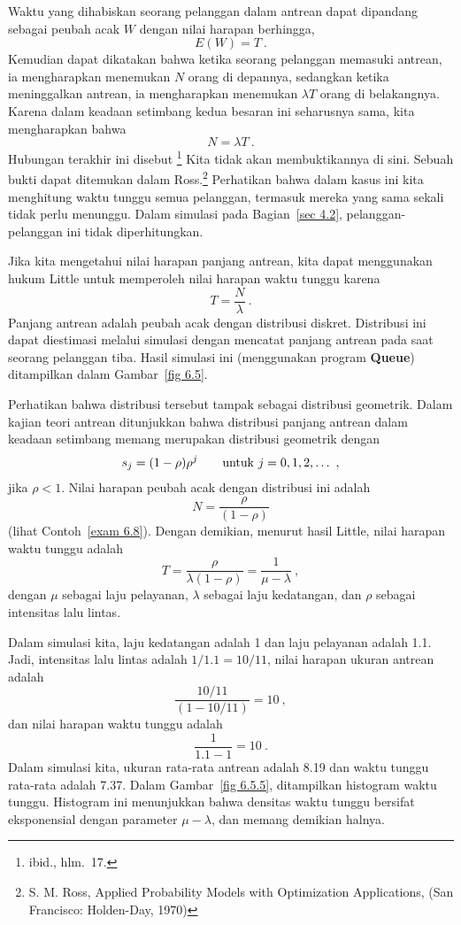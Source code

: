 {\begin{example}
Waktu yang dihabiskan seorang pelanggan dalam antrean dapat dipandang sebagai peubah
acak $W$ dengan nilai harapan berhingga,
$$ E(W) = T\ .
$$ Kemudian dapat dikatakan bahwa ketika seorang pelanggan memasuki antrean, ia
mengharapkan menemukan $N$ orang di depannya, sedangkan ketika meninggalkan antrean,
ia mengharapkan menemukan $\lambda T$ orang di belakangnya. Karena dalam keadaan
setimbang kedua besaran ini seharusnya sama, kita mengharapkan bahwa
$$ N = \lambda T\ .
$$ Hubungan terakhir ini disebut \footnote{ibid., hlm.~17.} Kita tidak akan membuktikannya di sini.
Sebuah bukti dapat ditemukan dalam Ross.\footnote{S. M. Ross,  \emx
{Applied Probability Models with Optimization Applications,} (San Francisco:
Holden-Day, 1970)} Perhatikan bahwa dalam kasus ini kita menghitung waktu tunggu semua
pelanggan, termasuk mereka yang sama sekali tidak perlu menunggu. Dalam simulasi pada
Bagian~\ref{sec 4.2}, pelanggan-pelanggan ini tidak diperhitungkan.
\par Jika kita mengetahui nilai harapan panjang antrean, kita dapat menggunakan hukum
Little untuk memperoleh nilai harapan waktu tunggu karena
$$ T = \frac N\lambda\ .
$$ Panjang antrean adalah peubah acak dengan distribusi diskret. Distribusi ini dapat
diestimasi melalui simulasi dengan mencatat panjang antrean pada saat seorang pelanggan
tiba. Hasil simulasi ini (menggunakan program {\bf Queue}) ditampilkan dalam
Gambar~\ref{fig 6.5}.
\par Perhatikan bahwa distribusi tersebut tampak sebagai distribusi geometrik. Dalam
kajian teori antrean ditunjukkan bahwa distribusi panjang antrean dalam keadaan setimbang
memang merupakan distribusi geometrik dengan
$$ s_j = (1 - \rho) \rho^j \qquad {\rm untuk}\  j = 0, 1, 2, \dots\ ,
$$ jika $\rho < 1$.
Nilai harapan peubah acak dengan distribusi ini adalah
$$ N = \frac \rho{(1 - \rho)}
$$ (lihat Contoh~\ref{exam 6.8}). Dengan demikian, menurut hasil Little, nilai harapan
waktu tunggu adalah
$$ T = \frac \rho{\lambda(1 - \rho)} = \frac 1{\mu - \lambda}\ ,
$$ dengan $\mu$ sebagai laju pelayanan, $\lambda$ sebagai laju kedatangan, dan $\rho$
sebagai intensitas lalu lintas.
\par 
Dalam simulasi kita, laju kedatangan adalah 1 dan laju pelayanan adalah 1.1. Jadi,
intensitas lalu lintas adalah $1/1.1 = 10/11$, nilai harapan ukuran antrean adalah
$$
\frac {10/11}{(1 - 10/11)} = 10\ ,
$$ dan nilai harapan waktu tunggu adalah
$$
\frac 1{1.1 - 1} = 10\ .
$$ Dalam simulasi kita, ukuran rata-rata antrean adalah 8.19 dan waktu tunggu rata-rata
adalah 7.37. Dalam Gambar~\ref{fig 6.5.5}, ditampilkan histogram waktu tunggu.
Histogram ini menunjukkan bahwa densitas waktu tunggu bersifat eksponensial dengan
parameter $\mu - \lambda$, dan memang demikian halnya.
\end{example}

}
